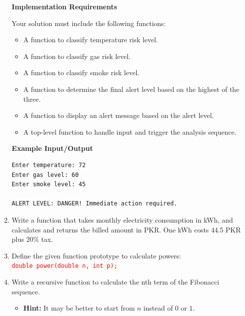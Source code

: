 \documentclass[12pt]{article}
\begin{document}
\begin{enumerate}
\noindent \textbf{Implementation Requirements}

\noindent Your solution must include the following functions:

\begin{itemize}
    \item A function to classify temperature risk level.
    \item A function to classify gas risk level.
    \item A function to classify smoke risk level.
    \item A function to determine the final alert level based on the highest of the three.
    \item A function to display an alert message based on the alert level.
    \item A top-level function to handle input and trigger the analysis sequence.
\end{itemize}

\noindent \textbf{Example Input/Output}

\begin{verbatim}
Enter temperature: 72
Enter gas level: 60
Enter smoke level: 45

ALERT LEVEL: DANGER! Immediate action required.
\end{verbatim}












\item Write a function that takes monthly electricity consumption in kWh, and calculates and returns the billed amount in PKR. One kWh costs 44.5 PKR plus 20\% tax.

\item Define the given function prototype to calculate powers: \\ \textcolor{red}{\texttt{double power(double n, int p);}} 

\item Write a recursive function to calculate the nth term of the Fibonacci sequence.

\begin{itemize}
    \item \textbf{Hint:} It may be better to start from $n$ instead of $0$ or $1$.
\end{itemize}



\end{enumerate}
\end{document}
